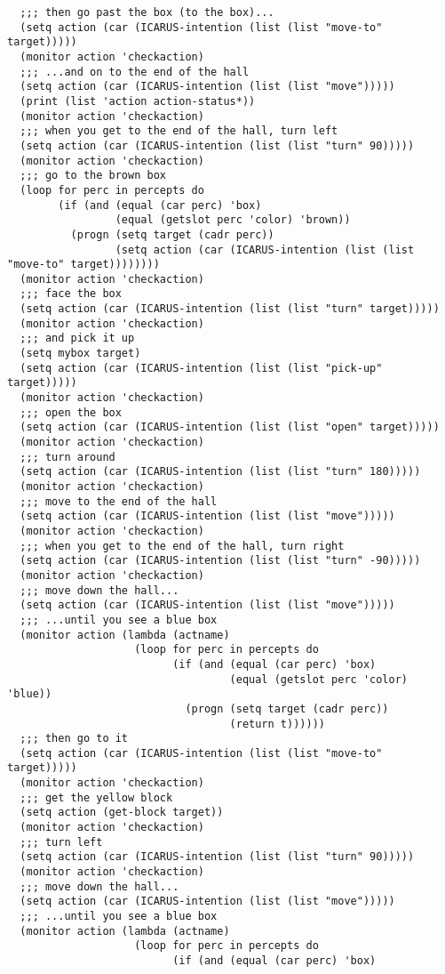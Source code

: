 \documentclass{article}
\begin{document}
\begin{verbatim}
  ;;; then go past the box (to the box)...
  (setq action (car (ICARUS-intention (list (list "move-to" target)))))
  (monitor action 'checkaction)
  ;;; ...and on to the end of the hall
  (setq action (car (ICARUS-intention (list (list "move")))))
  (print (list 'action action-status*))
  (monitor action 'checkaction)
  ;;; when you get to the end of the hall, turn left
  (setq action (car (ICARUS-intention (list (list "turn" 90)))))
  (monitor action 'checkaction)
  ;;; go to the brown box
  (loop for perc in percepts do
        (if (and (equal (car perc) 'box)
                 (equal (getslot perc 'color) 'brown))
          (progn (setq target (cadr perc))
                 (setq action (car (ICARUS-intention (list (list "move-to" target))))))))
  (monitor action 'checkaction)
  ;;; face the box
  (setq action (car (ICARUS-intention (list (list "turn" target)))))
  (monitor action 'checkaction)
  ;;; and pick it up
  (setq mybox target)
  (setq action (car (ICARUS-intention (list (list "pick-up" target)))))
  (monitor action 'checkaction)
  ;;; open the box
  (setq action (car (ICARUS-intention (list (list "open" target)))))
  (monitor action 'checkaction)
  ;;; turn around
  (setq action (car (ICARUS-intention (list (list "turn" 180)))))
  (monitor action 'checkaction)
  ;;; move to the end of the hall
  (setq action (car (ICARUS-intention (list (list "move")))))
  (monitor action 'checkaction)
  ;;; when you get to the end of the hall, turn right
  (setq action (car (ICARUS-intention (list (list "turn" -90)))))
  (monitor action 'checkaction)
  ;;; move down the hall...
  (setq action (car (ICARUS-intention (list (list "move")))))
  ;;; ...until you see a blue box
  (monitor action (lambda (actname)
                    (loop for perc in percepts do
                          (if (and (equal (car perc) 'box)
                                   (equal (getslot perc 'color) 'blue))
                            (progn (setq target (cadr perc))
                                   (return t))))))
  ;;; then go to it
  (setq action (car (ICARUS-intention (list (list "move-to" target)))))
  (monitor action 'checkaction)
  ;;; get the yellow block
  (setq action (get-block target))
  (monitor action 'checkaction)
  ;;; turn left
  (setq action (car (ICARUS-intention (list (list "turn" 90)))))
  (monitor action 'checkaction)
  ;;; move down the hall...
  (setq action (car (ICARUS-intention (list (list "move")))))
  ;;; ...until you see a blue box
  (monitor action (lambda (actname)
                    (loop for perc in percepts do
                          (if (and (equal (car perc) 'box)

\end{verbatim}
\end{document}
